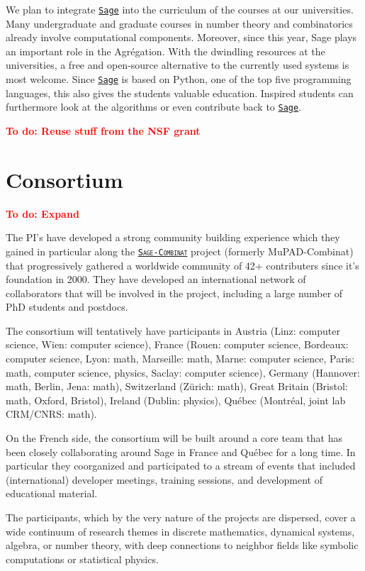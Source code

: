 \documentclass[a4,12pt]{amsart}
\newcommand{\sage}{\href{http://www.sagemath.org/}{\texttt{Sage}}\xspace}
\newcommand{\sagecombinat}{\href{http://wiki.sagemath.org/combinat/}{\texttt{Sage-Combinat}}\xspace}
\newcommand{\TODO}[2][To do: ]{{\textcolor{red}{\textbf{#1#2}}}}
\newcommand{\CS}{computer science}
\begin{document}
We plan to integrate \sage into the curriculum of the courses at our
universities. Many undergraduate and graduate courses in number theory
and combinatorics already involve computational components. Moreover,
since this year, Sage plays an important role in the Agrégation. With
the dwindling resources at the universities, a free and open-source
alternative to the currently used systems %
is most welcome. Since \sage is based on Python, one of the top five
programming languages, this also gives the students valuable
education.  Inspired students can furthermore look at the algorithms
or even contribute back to \sage.

\TODO{Reuse stuff from the NSF grant}

\section{Consortium}

\TODO{Expand}

The PI's have developed a strong community building experience which
they gained in particular along the \textsc{\sagecombinat} project
(formerly MuPAD-Combinat) that progressively gathered a worldwide
community of 42+ contributers since it's foundation in 2000. They have
developed an international network of collaborators that will be
involved in the project, including a large number of PhD students and
postdocs.

The consortium will tentatively have participants in Austria (Linz:
\CS, Wien: \CS), France (Rouen: \CS, Bordeaux: \CS, Lyon: math,
Marseille: math, Marne: \CS, Paris: math, \CS, physics, Saclay: \CS),
Germany (Hannover: math, Berlin, Jena: math), Switzerland (Zürich:
math), Great Britain (Bristol: math, Oxford, Bristol), Ireland
(Dublin: physics), Québec (Montréal, joint lab CRM/CNRS: math).

On the French side, the consortium will be built around a core team
that has been closely collaborating around Sage in France and Québec
for a long time.
In particular they coorganized and participated to a stream of events
that included (international) developer meetings, training sessions,
and development of educational material.

The participants, which by the very nature of the projects are
dispersed, cover a wide continuum of research themes in discrete
mathematics, dynamical systems, algebra, or number theory, with deep
connections to neighbor fields like symbolic computations or
statistical physics.
\end{document}
